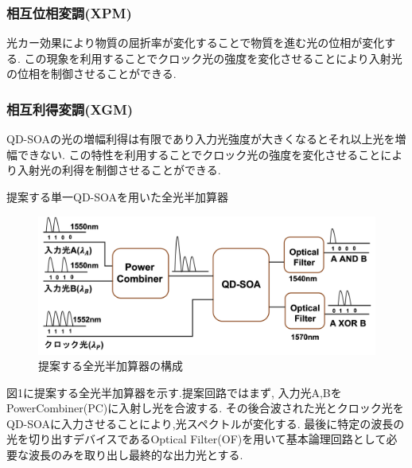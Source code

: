 \documentclass[dvipdfmx]{ujarticle}
\makeatletter
\def\section{\@startsection{section}{1}{\z@}
   {0.8\Cvs \@plus.5\Cdp \@minus.2\Cdp}
   {0.2\Cvs \@plus.3\Cdp}
   {\normalfont \Large \bfseries}}
\def\section{\@startsection{section}{1}{\z@}
   {0.8\Cvs \@plus.5\Cdp \@minus.2\Cdp}
   {0.2\Cvs \@plus.3\Cdp}
   {\normalfont \Large \bfseries}}
\makeatother
\begin{document}
    \subsubsection{相互位相変調(XPM)}
    光カー効果により物質の屈折率が変化することで物質を進む光の位相が変化する.
    この現象を利用することでクロック光の強度を変化させることにより入射光の位相を制御させることができる.
    \subsubsection{相互利得変調(XGM)}
    QD-SOAの光の増幅利得は有限であり入力光強度が大きくなるとそれ以上光を増幅できない.
      この特性を利用することでクロック光の強度を変化させることにより入射光の利得を制御させることができる.

\section{提案する単一QD-SOAを用いた全光半加算器}
  \begin{figure}[H]
    \begin{center}
      \includegraphics[width=15cm]{images/kairo.png}
      \caption{提案する全光半加算器の構成}
    \end{center}
  \end{figure}
  図1に提案する全光半加算器を示す.提案回路ではまず, 入力光A,BをPowerCombiner(PC)に入射し光を合波する.
  その後合波された光とクロック光をQD-SOAに入力させることにより,光スペクトルが変化する.
  最後に特定の波長の光を切り出すデバイスであるOptical Filter(OF)を用いて基本論理回路として必要な波長のみを取り出し最終的な出力光とする.
\end{document}
